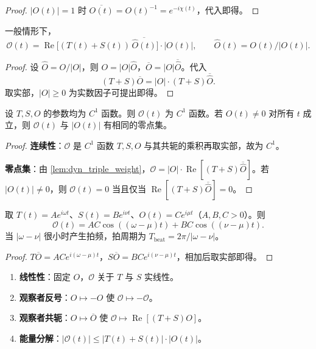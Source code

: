 \begin{proof}
$|O(t)|=1$ 时 $\overline{O(t)}=O(t)^{-1}=e^{-i\chi(t)}$，代入即得。
\end{proof}

\begin{lemma}[双线性配对与模长权重]\label{lem:dyn_triple_weight}
一般情形下，
\[
\mathcal O(t)=\operatorname{Re}\!\big[(T(t)+S(t))\,\overline{\widehat O(t)}\big]\cdot|O(t)|,
\qquad \widehat O(t)=O(t)/|O(t)|.
\]
\end{lemma}

\begin{proof}
设 $\widehat O=O/|O|$，则 $O=|O|\widehat O$，$\overline O=|O|\overline{\widehat O}$。代入
\[
(T+S)\overline O=|O|\cdot(T+S)\overline{\widehat O}.
\]
取实部，$|O|\ge 0$ 为实数因子可提出即得。
\end{proof}

\begin{theorem}[三组动态投影的连续性]\label{thm:dyn_triple_continuity}
设 $T,S,O$ 的参数均为 $C^1$ 函数。则 $\mathcal O(t)$ 为 $C^1$ 函数。若 $O(t)\neq 0$ 对所有 $t$ 成立，则 $\mathcal O(t)$ 与 $|O(t)|$ 有相同的零点集。
\end{theorem}

\begin{proof}
\textbf{连续性}：$\mathcal O$ 是 $C^1$ 函数 $T,S,O$ 与其共轭的乘积再取实部，故为 $C^1$。

\textbf{零点集}：由 \cref{lem:dyn_triple_weight}，$\mathcal O=|O|\cdot\operatorname{Re}[(T+S)\overline{\widehat O}]$。若 $|O(t)|\neq 0$，则 $\mathcal O(t)=0$ 当且仅当 $\operatorname{Re}[(T+S)\overline{\widehat O}]=0$。
\end{proof}

\begin{corollary}[三组单频的拍频公式]\label{cor:dyn_triple_beat}
取 $T(t)=A e^{i\omega t}$、$S(t)=B e^{i\nu t}$、$O(t)=C e^{i\mu t}$（$A,B,C>0$）。则
\[
\mathcal O(t)=AC\cos((\omega-\mu)t)+BC\cos((\nu-\mu)t).
\]
当 $|\omega-\nu|$ 很小时产生拍频，拍周期为 $T_{\text{beat}}=2\pi/|\omega-\nu|$。
\end{corollary}

\begin{proof}
$T\overline O=AC e^{i(\omega-\mu)t}$，$S\overline O=BC e^{i(\nu-\mu)t}$，相加后取实部即得。
\end{proof}

\begin{property}[三组动态投影的基本性质]\label{prop:dyn_triple_properties}
\begin{enumerate}[label=(\roman*)]
    \item \textbf{线性性}：固定 $O$，$\mathcal O$ 关于 $T$ 与 $S$ 实线性。
    \item \textbf{观察者反号}：$O\mapsto-O$ 使 $\mathcal O\mapsto-\mathcal O$。
    \item \textbf{观察者共轭}：$O\mapsto\overline O$ 使 $\mathcal O\mapsto\operatorname{Re}[(T+S)O]$。
    \item \textbf{能量分解}：$|\mathcal O(t)|\le|T(t)+S(t)|\cdot|O(t)|$。
\end{enumerate}
\end{property}

